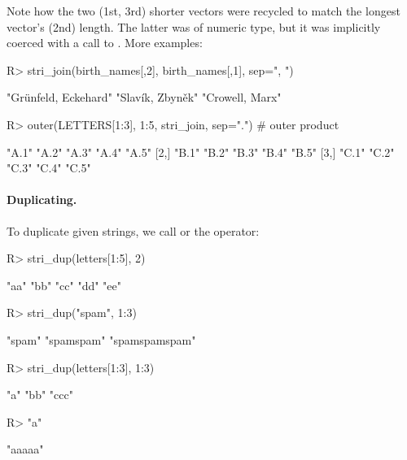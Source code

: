 \documentclass[nojss]{jss}\usepackage[]{graphicx}\usepackage[]{color}
\begin{document}
\noindent
Note how the two (1st, 3rd) shorter vectors were {recycled} to match
the longest vector's (2nd) length. The latter was of numeric type,
but it was implicitly coerced with  a call to .
More examples:

\begin{Schunk}
\begin{Sinput}
R> stri_join(birth_names[,2], birth_names[,1], sep=", ")
\end{Sinput}
\begin{Soutput}
[1] "Grünfeld, Eckehard" "Slavík, Zbyněk"     "Crowell, Marx"
\end{Soutput}
\begin{Sinput}
R> outer(LETTERS[1:3], 1:5, stri_join, sep=".") # outer product
\end{Sinput}
\begin{Soutput}
     [,1]  [,2]  [,3]  [,4]  [,5]
[1,] "A.1" "A.2" "A.3" "A.4" "A.5"
[2,] "B.1" "B.2" "B.3" "B.4" "B.5"
[3,] "C.1" "C.2" "C.3" "C.4" "C.5"
\end{Soutput}
\end{Schunk}


\paragraph{Duplicating.}
To duplicate given strings, we call
 or the  operator:


\begin{Schunk}
\begin{Sinput}
R> stri_dup(letters[1:5], 2)
\end{Sinput}
\begin{Soutput}
[1] "aa" "bb" "cc" "dd" "ee"
\end{Soutput}
\begin{Sinput}
R> stri_dup("spam", 1:3)
\end{Sinput}
\begin{Soutput}
[1] "spam"         "spamspam"     "spamspamspam"
\end{Soutput}
\begin{Sinput}
R> stri_dup(letters[1:3], 1:3)
\end{Sinput}
\begin{Soutput}
[1] "a"   "bb"  "ccc"
\end{Soutput}
\begin{Sinput}
R> "a" %s*% 5
\end{Sinput}
\begin{Soutput}
[1] "aaaaa"
\end{Soutput}
\end{Schunk}
\end{document}
